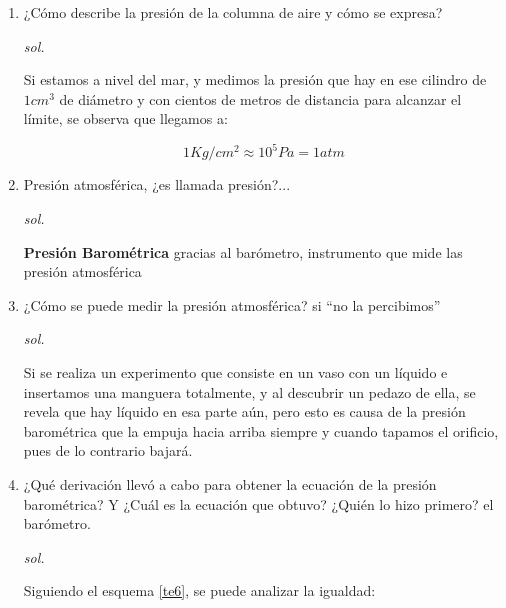 \begin{enumerate}
    \item  ¿Cómo describe la presión de la columna de aire y cómo se expresa?
    
    \textit{sol. }
    
    Si estamos a nivel del mar, y medimos la presión que hay en ese cilindro de $1cm^3$ de diámetro y con cientos de metros de distancia para alcanzar el límite, se observa que llegamos a:
    
    \begin{equation}
        1Kg/cm^2\approx 10^5Pa=1atm
    \end{equation}
    
    \item  Presión atmosférica, ¿es llamada presión?...
    
    \textit{sol. }
    
    \textbf{Presión Barométrica} gracias al barómetro, instrumento que mide las presión atmosférica
    
    \item  ¿Cómo se puede medir la presión atmosférica? si ``no la percibimos''
    
    \textit{sol. }
    
    Si se realiza un experimento que consiste en un vaso con un líquido e insertamos una manguera totalmente, y al descubrir un pedazo de ella, se revela que hay líquido en esa parte aún, pero esto es causa de la presión barométrica que la empuja hacia arriba siempre y cuando tapamos el orificio, pues de lo contrario bajará. 

    \item  ¿Qué derivación llevó a cabo para obtener la ecuación de la presión barométrica? Y ¿Cuál es la ecuación que obtuvo? ¿Quién lo hizo primero? el barómetro.
    
    \textit{sol. }
    
    Siguiendo el esquema \ref{te6}, se puede analizar la igualdad:
    

\end{enumerate}
